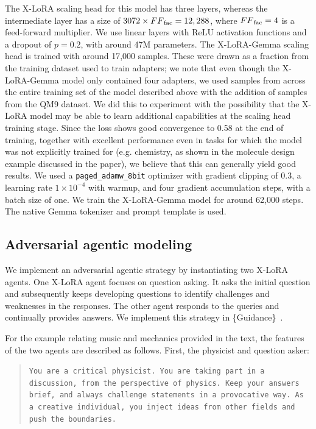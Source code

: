 \documentclass{article}
\begin{document}
The X-LoRA scaling head for this model has three layers, whereas the intermediate layer has a size of $3072\times {FF}_{\rm fac}=12,288$, where ${FF}_{\rm fac}=4$ is a feed-forward multiplier. We use linear layers with ReLU activation functions and a dropout of $p=0.2$, with around 47M parameters.
%
The X-LoRA-Gemma scaling head is trained with around 17,000 samples. These were drawn as a fraction from the training dataset used to train adapters; we note that even though the X-LoRA-Gemma model only contained four adapters, we used samples from across the entire training set of the model described above with the addition of samples from the QM9 dataset. We did this to experiment with the possibility that the X-LoRA model may be able to learn additional capabilities at the scaling head training stage. Since the loss shows good convergence to 0.58 at the end of training, together with excellent performance even in tasks for which the model was not explicitly trained for (e.g. chemistry, as shown in the molecule design example discussed in the paper), we believe that this can generally yield good results.
%
We used a \texttt{paged\_adamw\_8bit} optimizer with gradient clipping of 0.3, a learning rate $1\times 10^{-4}$ with warmup, and four gradient accumulation steps, with a batch size of one. We train the X-LoRA-Gemma model for around 62,000 steps. 
%
The native Gemma tokenizer and prompt template is used. 



\subsection{Adversarial agentic modeling}
We implement an adversarial agentic strategy by instantiating two X-LoRA agents. One X-LoRA agent focuses on question asking. It asks the initial question and subsequently keeps developing questions to identify challenges and weaknesses in the responses. The other agent responds to the queries and continually provides answers. We implement this strategy in \{Guidance\}~\cite{Guidance-ai/guidance:Models.}.

For the example relating music and mechanics provided in the text, the features of the two agents are described as follows. First, the physicist and question asker:
\begin{quote}
\small\texttt{You are a critical physicist. You are taking part in a discussion, from the perspective of physics.
Keep your answers brief, and always challenge statements in a provocative way.
\newline\newline
As a creative individual, you inject ideas from other fields and push the boundaries.}
\end{quote}
\end{document}

